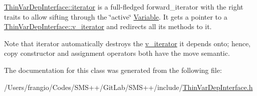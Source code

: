 \mbox{\hyperlink{class_s_m_spp__di__unipi__it_1_1_thin_var_dep_interface_1_1iterator}{Thin\+Var\+Dep\+Interface\+::iterator}} is a full-\/fledged forward\+\_\+iterator with the right traits to allow sifting through the \char`\"{}active\char`\"{} \mbox{\hyperlink{class_s_m_spp__di__unipi__it_1_1_variable}{Variable}}. It gets a pointer to a \mbox{\hyperlink{class_s_m_spp__di__unipi__it_1_1_thin_var_dep_interface_1_1v__iterator}{Thin\+Var\+Dep\+Interface\+::v\+\_\+iterator}} and redirects all its methods to it.

Note that iterator automatically destroys the \mbox{\hyperlink{class_s_m_spp__di__unipi__it_1_1_thin_var_dep_interface_1_1v__iterator}{v\+\_\+iterator}} it depends onto; hence, copy constructor and assignment operators both have the move semantic. 

The documentation for this class was generated from the following file\+:\begin{DoxyCompactItemize}
\item 
/\+Users/frangio/\+Codes/\+S\+M\+S++/\+Git\+Lab/\+S\+M\+S++/include/\mbox{\hyperlink{_thin_var_dep_interface_8h}{Thin\+Var\+Dep\+Interface.\+h}}\end{DoxyCompactItemize}
